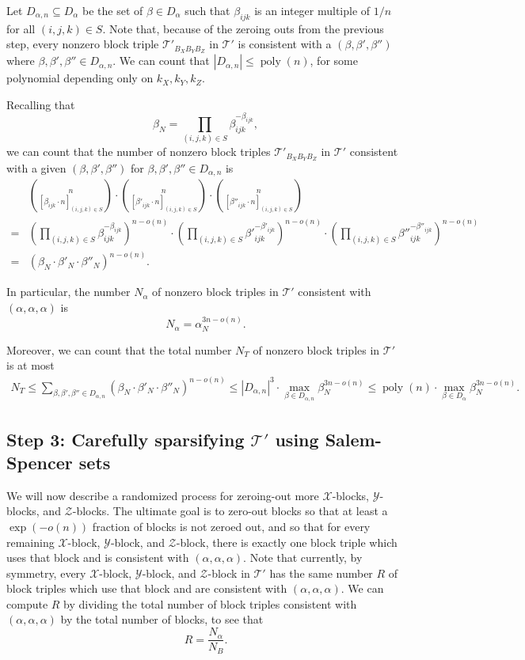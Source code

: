 \PassOptionsToPackage{shortlabels}{enumitem}\documentclass[10pt,a4paper]{article}
\newcommand{\poly}{\mathop{\mathrm{poly}}}
\newcommand{\T}{\mathcal{T}}
\newcommand{\X}{\mathcal{X}}
\newcommand{\Y}{\mathcal{Y}}
\newcommand{\Z}{\mathcal{Z}}
\begin{document}
Let $D_{\alpha,n} \subseteq D_\alpha$ be the set of $\beta \in D_\alpha$ such that $\beta_{ijk}$ is an integer multiple of $1/n$ for all $(i,j,k) \in S$.
Note that, because of the zeroing outs from the previous step, every nonzero block triple $\T'_{B_X B_Y B_Z}$ in $\T'$ is consistent with a $(\beta,\beta',\beta'')$ where $\beta,\beta',\beta'' \in D_{\alpha,n}$.
We can count that $|D_{\alpha,n}| \leq \poly(n)$, for some polynomial depending only on $k_X, k_Y, k_Z$.

Recalling that $$\beta_N = \prod_{(i,j,k) \in S} \beta_{ijk}^{-\beta_{ijk}},$$ we can count that the number of nonzero block triples $\T'_{B_X B_Y B_Z}$ in $\T'$ consistent with a given $(\beta,\beta',\beta'')$ for $\beta,\beta',\beta'' \in D_{\alpha,n}$ is  \begin{align*}&\binom{n}{[\beta_{ijk} \cdot n]_{(i,j,k) \in S}} \cdot \binom{n}{[{\beta'}_{ijk} \cdot n]_{(i,j,k) \in S}} \cdot \binom{n}{[{\beta''}_{ijk} \cdot n]_{(i,j,k) \in S}} \\ = & \left( \prod_{(i,j,k) \in S} \beta_{ijk}^{-\beta_{ijk}} \right)^{n-o(n)} \cdot \left( \prod_{(i,j,k) \in S} {\beta'}_{ijk}^{-{\beta'}_{ijk}} \right)^{n-o(n)} \cdot \left( \prod_{(i,j,k) \in S} {\beta''}_{ijk}^{-{\beta''}_{ijk}} \right)^{n-o(n)} \\ = &(\beta_N \cdot \beta'_N \cdot \beta''_N)^{n - o(n)}.\end{align*}

In particular, the number $N_\alpha$ of nonzero block triples in $\T'$ consistent with $(\alpha,\alpha,\alpha)$ is $$N_\alpha = \alpha_N^{3n - o(n)}.$$

Moreover, we can count that the total number $N_T$ of nonzero block triples in $\T'$ is at most
\begin{align*}
    N_T \leq \sum_{\beta, \beta', \beta'' \in D_{\alpha,n}} (\beta_N \cdot \beta'_N \cdot \beta''_N)^{n - o(n)} \leq |D_{\alpha,n}|^3 \cdot \max_{\beta \in D_{\alpha,n}} \beta_N^{3n - o(n)} \leq \poly(n) \cdot \max_{\beta \in D_{\alpha}} \beta_N^{3n - o(n)}.
\end{align*}

\subsection{Step 3: Carefully sparsifying \texorpdfstring{$\T'$}{T'} using Salem-Spencer sets}\label{subsec:step3}

We will now describe a randomized process for zeroing-out more $\X$-blocks, $\Y$-blocks, and $\Z$-blocks. The ultimate goal is to zero-out blocks so that at least a $\exp(-o(n))$ fraction of blocks is not zeroed out, and so that for every remaining $\X$-block, $\Y$-block, and $\Z$-block, there is exactly one block triple which uses that block and is consistent with $(\alpha,\alpha,\alpha)$. Note that currently, by symmetry, every  $\X$-block, $\Y$-block, and $\Z$-block in $\T'$ has the same number $R$ of block triples which use that block and are consistent with $(\alpha,\alpha,\alpha)$. We can compute $R$ by dividing the total number of block triples consistent with $(\alpha,\alpha,\alpha)$ by the total number of blocks, to see that $$R = \frac{N_\alpha}{N_B}.$$
\end{document}
